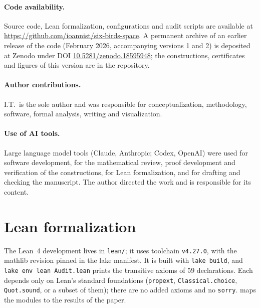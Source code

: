 \documentclass[11pt]{article}
\begin{document}
\paragraph{Code availability.}
Source code, Lean formalization, configurations and audit scripts are available at \url{https://github.com/ioannist/six-birds-space}. A permanent archive of an earlier release of the code (February 2026, accompanying versions 1 and 2) is deposited at Zenodo under DOI \href{https://doi.org/10.5281/zenodo.18595948}{10.5281/zenodo.18595948}; the constructions, certificates and figures of this version are in the repository.

\paragraph{Author contributions.}
I.T.\ is the sole author and was responsible for conceptualization, methodology, software, formal analysis, writing and visualization.

\paragraph{Use of AI tools.}
Large language model tools (Claude, Anthropic; Codex, OpenAI) were used for software development, for the mathematical review, proof development and verification of the constructions, for Lean formalization, and for drafting and checking the manuscript. The author directed the work and is responsible for its content.
 
\clearpage



\appendix
\section{Lean formalization}
\label{app:lean}

The Lean~4 development lives in \texttt{lean/}; it uses toolchain \texttt{v4.27.0}, with the mathlib revision pinned in the lake manifest.
It is built with \texttt{lake build}, and \texttt{lake env lean Audit.lean} prints the transitive axioms of $59$ declarations.
Each depends only on Lean's standard foundations (\texttt{propext}, \texttt{Classical.choice}, \texttt{Quot.sound}, or a subset of them); there are no added axioms and no \texttt{sorry}.
 maps the modules to the results of the paper.
\end{document}
